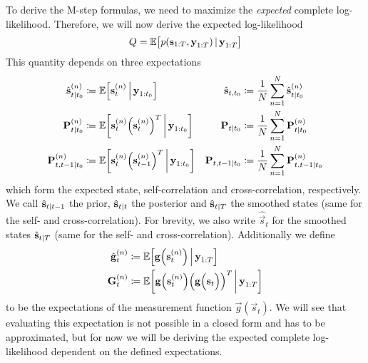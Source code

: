 	To derive the M-step formulas, we need to maximize the \emph{expected} complete log-likelihood. Therefore, we will now derive the expected log-likelihood
	\begin{equation*}
		Q = \mathbb{E}\big[ p(\boldsymbol{\mathrm{s}}_{1:T}, \boldsymbol{\mathrm{y}}_{1:T}) \,\vert\, \boldsymbol{\mathrm{y}}_{1:T} \big]
	\end{equation*}
	This quantity depends on three expectations
	\begin{align*}
		\hat{\boldsymbol{\mathrm{s}}}_{t \vert t_0}^{(n)}  & \coloneqq \mathbb{E}\Big[\boldsymbol{\mathrm{s}}_t^{(n)} \,\Big\vert\, \boldsymbol{\mathrm{y}}_{1:t_0}\Big]                                      & \hat{\boldsymbol{\mathrm{s}}}_{t, t_0}           & \coloneqq \frac{1}{N} \sum_{n = 1}^{N} \hat{\boldsymbol{\mathrm{s}}}_{t \vert t_0}^{(n)}  \\
		\boldsymbol{\mathrm{P}}_{t \vert t_0}^{(n)}        & \coloneqq \mathbb{E}\bigg[\boldsymbol{\mathrm{s}}_t^{(n)} \Big(\boldsymbol{\mathrm{s}}_t^{(n)}\Big)^T \,\bigg\vert\, \boldsymbol{\mathrm{y}}_{1:t_0}\bigg]       & \boldsymbol{\mathrm{P}}_{t \vert t_0}        & \coloneqq \frac{1}{N} \sum_{n = 1}^{N} \boldsymbol{\mathrm{P}}_{t \vert t_0}^{(n)}        \\
		\boldsymbol{\mathrm{P}}_{t, t - 1 \vert t_0}^{(n)} & \coloneqq \mathbb{E}\bigg[\boldsymbol{\mathrm{s}}_t^{(n)} \Big(\boldsymbol{\mathrm{s}}_{t - 1}^{(n)}\Big)^T \,\bigg\vert\, \boldsymbol{\mathrm{y}}_{1:t_0}\bigg] & \boldsymbol{\mathrm{P}}_{t, t - 1 \vert t_0} & \coloneqq \frac{1}{N} \sum_{n = 1}^{N} \boldsymbol{\mathrm{P}}_{t, t - 1 \vert t_0}^{(n)}
	\end{align*}
	which form the expected state, self-correlation and cross-correlation, respectively. We call \( \hat{\boldsymbol{\mathrm{s}}}_{t \vert t - 1} \) the prior, \( \hat{\boldsymbol{\mathrm{s}}}_{t \vert t} \) the posterior and \( \hat{\boldsymbol{\mathrm{s}}}_{t \vert T} \) the smoothed states (same for the self- and cross-correlation). For brevity, we also write \( \hat{\vec{s}}_t \) for the smoothed states \( \hat{\boldsymbol{\mathrm{s}}}_{t \vert T} \) (same for the self- and cross-correlation). Additionally we define
	\begin{align}
		\hat{\boldsymbol{\mathrm{g}}}_t^{(n)} & \coloneqq \mathbb{E}\Big[\boldsymbol{\mathrm{g}}\Big(\boldsymbol{\mathrm{s}}_t^{(n)}\Big) \,\Big\vert\, \boldsymbol{\mathrm{y}}_{1:T}\Big]    \label{eq:expectedMeasurement}                                              \\
		\boldsymbol{\mathrm{G}}_t^{(n)}       & \coloneqq \mathbb{E}\bigg[\boldsymbol{\mathrm{g}}\Big(\boldsymbol{\mathrm{s}}_t^{(n)}\Big) \Big(\boldsymbol{\mathrm{g}}\Big(\boldsymbol{\mathrm{s}}_t\Big)\Big)^T \,\bigg\vert\, \boldsymbol{\mathrm{y}}_{1:T}\bigg]    \label{eq:expectedMeasurementMat}
	\end{align}
	to be the expectations of the measurement function \( \vec{g}(\vec{s}_t) \). We will see that evaluating this expectation is not possible in a closed form and has to be approximated, but for now we will be deriving the expected complete log-likelihood dependent on the defined expectations.
	
